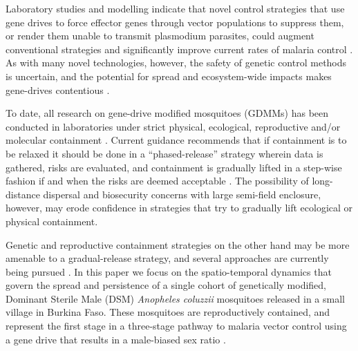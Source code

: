 \documentclass[]{bmcart}
\begin{document}
Laboratory studies and modelling indicate that novel control strategies that use gene drives to force effector genes through vector populations to suppress them, or render them unable to transmit plasmodium parasites, could augment conventional strategies and significantly improve current rates of malaria control \citep{Gabrieli2014,Beaghton2017, CarballarLejarazu2020,Simoni2020}. As with many novel technologies, however, the safety of genetic control methods is uncertain, and the potential for spread and ecosystem-wide impacts makes gene-drives contentious \citep{Ledord2015,Champer2016}.

To date, all research on gene-drive modified mosquitoes (GDMMs) has been conducted in laboratories under strict physical, ecological, reproductive and/or molecular containment \citep{Akbari2015}. Current guidance recommends that if containment is to be relaxed it should be done in a ``phased-release'' strategy wherein data is gathered, risks are evaluated, and containment is gradually lifted in a step-wise fashion if and when the risks are deemed acceptable \citep{WHOTDRFNIH2014,NASEM2016}. The possibility of long-distance dispersal \citep{Huestis2019} and biosecurity concerns with large semi-field enclosure, however, may erode confidence in strategies that try to gradually lift ecological or physical containment. 

Genetic and reproductive containment strategies on the other hand may be more amenable to a gradual-release strategy, and several approaches are currently being pursued \citep{Klein2012,Galizi2014,Nash2019}. In this paper we focus on the spatio-temporal dynamics that govern the spread and persistence of a single cohort of genetically modified, Dominant Sterile Male (DSM) \textit{Anopheles coluzzii} mosquitoes released in a small village in Burkina Faso. These mosquitoes are reproductively contained, and represent the first stage in a three-stage pathway to malaria vector control using a gene drive that results in a male-biased sex ratio \citep{Beaghton2017a,North2019}.

\end{document}

